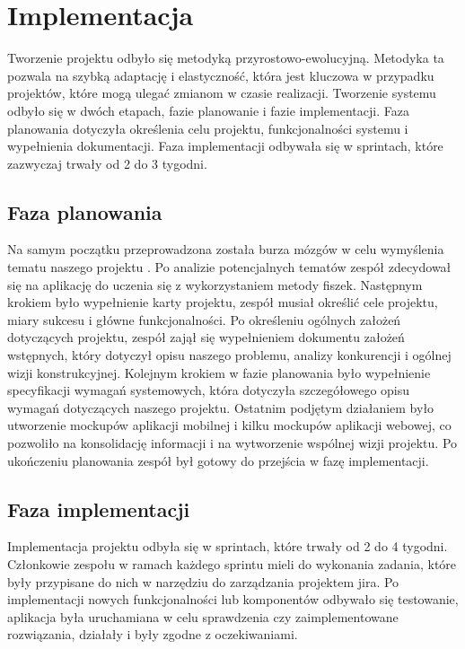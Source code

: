 \chapter{Implementacja}

Tworzenie projektu odbyło się metodyką przyrostowo-ewolucyjną. Metodyka ta pozwala na szybką adaptację i elastyczność, która jest kluczowa w przypadku projektów, które mogą ulegać zmianom w czasie realizacji. Tworzenie systemu odbyło się w dwóch etapach, fazie planowanie i fazie implementacji. Faza planowania dotyczyła określenia celu projektu, funkcjonalności systemu i wypełnienia dokumentacji. Faza implementacji odbywała się w sprintach, które zazwyczaj trwały od 2 do 3 tygodni.

\section{Faza planowania}

Na samym początku przeprowadzona została burza mózgów w celu wymyślenia tematu naszego projektu \cite{osborn1953}. Po analizie potencjalnych tematów zespół zdecydował się na aplikację do uczenia się z wykorzystaniem metody fiszek. Następnym krokiem było wypełnienie karty projektu, zespół musiał określić cele projektu, miary sukcesu i główne funkcjonalności. Po określeniu ogólnych założeń dotyczących projektu, zespół zajął się wypełnieniem dokumentu założeń wstępnych, który dotyczył opisu naszego problemu, analizy konkurencji i ogólnej wizji konstrukcyjnej. Kolejnym krokiem w fazie planowania było wypełnienie specyfikacji wymagań systemowych, która dotyczyła szczegółowego opisu wymagań dotyczących naszego projektu. Ostatnim podjętym działaniem było utworzenie mockupów aplikacji mobilnej i kilku mockupów aplikacji webowej, co pozwoliło na konsolidację informacji i na wytworzenie wspólnej wizji projektu. Po ukończeniu planowania zespół był gotowy do przejścia w fazę implementacji.

\section{Faza implementacji}

Implementacja projektu odbyła się w sprintach, które trwały od 2 do 4 tygodni. Członkowie zespołu w ramach każdego sprintu mieli do wykonania zadania, które były przypisane do nich w narzędziu do zarządzania projektem jira. Po implementacji nowych funkcjonalności lub komponentów odbywało się testowanie, aplikacja była uruchamiana w celu sprawdzenia czy zaimplementowane rozwiązania, działały i były zgodne z oczekiwaniami.

